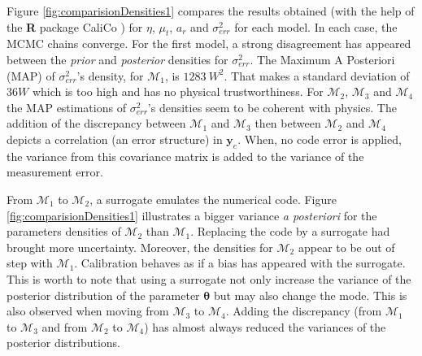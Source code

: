 \documentclass[soumission]{jsfds}
\begin{document}
Figure \ref{fig:comparisionDensities1} compares the results obtained (with the help of the \textbf{R} package CaliCo \citep{CaliCo}) 
for $\eta$, $\mu_t$, $a_r$ and $\sigma_{err}^2$ for each model. In each case, the MCMC chains converge. 
For the first model, a strong disagreement has appeared between the \textit{prior} and \textit{posterior} densities for $\sigma_{err}^2$. 
The Maximum A Posteriori (MAP) of $\sigma_{err}^2$'s density, for $\mathcal{M}_1$,
 is $1283\ W^2$. That makes a standard deviation of $36W$ which is too high and has no physical trustworthiness. 
For $\mathcal{M}_2$, $\mathcal{M}_3$ and $\mathcal{M}_4$ the MAP estimations of $\sigma_{err}^2$'s densities seem to be coherent with physics. The addition of the discrepancy between $\mathcal{M}_1$ and $\mathcal{M}_3$ then between $\mathcal{M}_2$ and $\mathcal{M}_4$ depicts a correlation (an error structure) in $\boldsymbol{y}_e$. When, no code error is applied, the variance from this covariance matrix is added to the variance of the measurement error. \newline

 
From $\mathcal{M}_1$ to $\mathcal{M}_2$, a surrogate emulates the numerical code. Figure \ref{fig:comparisionDensities1} illustrates
a bigger variance \textit{a posteriori} for the parameters densities of $\mathcal{M}_2$ than $\mathcal{M}_1$. Replacing the code by
a surrogate had brought more uncertainty. Moreover, the densities for $\mathcal{M}_2$ appear to be out of step with $\mathcal{M}_1$.
Calibration behaves as if a bias has appeared with the surrogate. This is worth to note that using a surrogate not only increase the variance
of the posterior distribution of the parameter $\boldsymbol{\theta}$ but may also change the mode. This is also observed when moving from
$\mathcal{M}_3$ to $\mathcal{M}_4$.
Adding the discrepancy (from $\mathcal{M}_1$ to $\mathcal{M}_3$ and from $\mathcal{M}_2$ to $\mathcal{M}_4$) has almost always reduced the variances
of the posterior distributions.
\newline
\end{document}
